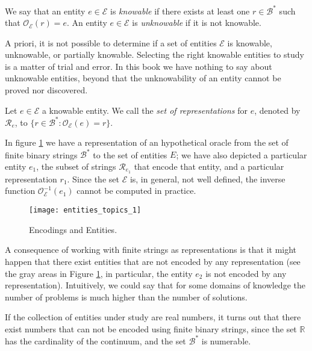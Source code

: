 \begin{definition}
We say that an entity $e \in \mathcal{E}$ is \emph{knowable} if there exists at least one $r \in \mathcal{B}^\ast$ such that $\mathcal{O}_\mathcal{E}(r) = e$. An entity $e \in \mathcal{E}$ is \emph{unknowable} if it is not knowable.
\end{definition}

A priori, it is not possible to determine if a set of entities $\mathcal{E}$ is knowable, unknowable, or partially knowable. Selecting the right knowable entities to study is a matter of trial and error. In this book we have nothing to say about unknowable entities, beyond that the unknowability of an entity cannot be proved nor discovered.

\begin{definition}
Let $e \in \mathcal{E}$ a knowable entity. We call the \emph{set of representations} for $e$, denoted by $\mathcal{R}_e$, to $\{ r \in \mathcal{B}^\ast : \mathcal{O}_\mathcal{E} (e) = r \}$.
\end{definition}

In figure \ref{fig:entities_topics_1} we have a representation of an hypothetical oracle from the set of finite binary strings $\mathcal{B}^\ast$ to the set of entities $E$; we have also depicted a particular entity $e_1$, the subset of strings $\mathcal{R}_{e_1}$ that encode that entity, and a particular representation $r_1$. Since the set $\mathcal{E}$ is, in general, not well defined, the inverse function $\mathcal{O}_\mathcal{E}^{-1}(e_1)$ cannot be computed in practice.

\begin{figure}[h]
\centering\texttt{[image: entities\_topics\_1]}
\caption{\label{fig:entities_topics_1}Encodings and Entities.}
\end{figure}

A consequence of working with finite strings as representations is that it might happen that there exist entities that are not encoded by any representation (see the gray areas in Figure \ref{fig:entities_topics_1}, in particular, the entity $e_2$ is not encoded by any representation). Intuitively, we could say that for some domains of knowledge the number of problems is much higher than the number of solutions.

\begin{example}
If the collection of entities under study are real numbers, it turns out that there exist numbers that can not be encoded using finite binary strings, since the set $\mathbb{R}$ has the cardinality of the continuum, and the set $\mathcal{B}^\ast$ is numerable.
\end{example}

